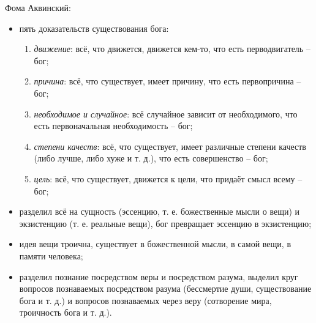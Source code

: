Фома Аквинский:
\begin{itemize}
	\item пять доказательств существования бога:
	\begin{enumerate}
		\item \textit{движение}: всё, что движется, движется кем-то, что есть перводвигатель -- бог;
		\item \textit{причина}: всё, что существует, имеет причину, что есть первопричина -- бог;
		\item \textit{необходимое и случайное}: всё случайное зависит от необходимого, что есть первоначальная необходимость -- бог;
		\item \textit{степени качеств}: всё, что существует, имеет различные степени качеств (либо лучше, либо хуже и т. д.), что есть совершенство -- бог;
		\item \textit{цель}: всё, что существует, движется к цели, что придаёт смысл всему -- бог;
	\end{enumerate}
	\item разделил всё на сущность (эссенцию, т. е. божественные мысли о вещи) и экзистенцию (т. е. реальные вещи), бог превращает эссенцию в экзистенцию;
	\item идея вещи троична, существует в божественной мысли, в самой вещи, в памяти человека;
	\item разделил познание посредством веры и посредством разума, выделил круг вопросов познаваемых посредством разума (бессмертие души, существование бога и т. д.) и вопросов познаваемых через веру (сотворение мира, троичность бога и т. д.).
\end{itemize}